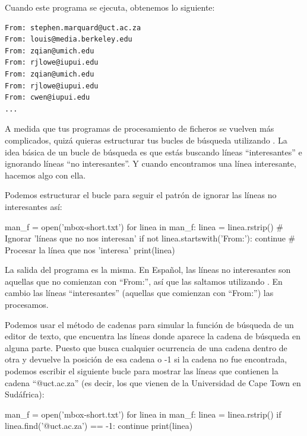Cuando este programa se ejecuta, obtenemos lo siguiente:

\begin{Verbatim}[frame=single]
From: stephen.marquard@uct.ac.za
From: louis@media.berkeley.edu
From: zqian@umich.edu
From: rjlowe@iupui.edu
From: zqian@umich.edu
From: rjlowe@iupui.edu
From: cwen@iupui.edu
...
\end{Verbatim}

A medida que tus programas de procesamiento de ficheros se vuelven más
complicados, quizá quieras estructurar tus bucles de búsqueda utilizando
. La idea básica de un bucle de búsqueda es que estás
buscando líneas ``interesantes'' e ignorando líneas ``no interesantes''.
Y cuando encontramos una línea interesante, hacemos algo con ella.

Podemos estructurar el bucle para seguir el patrón de ignorar las líneas
no interesantes así:

\begin{python}[frame=single]
man_f = open('mbox-short.txt')
for linea in man_f:
    linea = linea.rstrip()
    # Ignorar 'líneas que no nos interesan'
    if not linea.startswith('From:'):
        continue
    # Procesar la línea que nos 'interesa'
    print(linea)

\end{python}

La salida del programa es la misma. En Español, las líneas no
interesantes son aquellas que no comienzan con ``From:'', así que las
saltamos utilizando . En cambio las líneas
``interesantes'' (aquellas que comienzan con ``From:'') las procesamos.

Podemos usar el método de cadenas  para simular la función
de búsqueda de un editor de texto, que encuentra las líneas donde
aparece la cadena de búsqueda en alguna parte. Puesto que 
busca cualquier ocurrencia de una cadena dentro de otra y devuelve la
posición de esa cadena o -1 si la cadena no fue encontrada, podemos
escribir el siguiente bucle para mostrar las líneas que contienen la
cadena ``@uct.ac.za'' (es decir, los que vienen de la Universidad de
Cape Town en Sudáfrica):

\begin{python}[frame=single]
man_f = open('mbox-short.txt')
for linea in man_f:
    linea = linea.rstrip()
    if linea.find('@uct.ac.za') == -1: continue
    print(linea)
\end{python}

